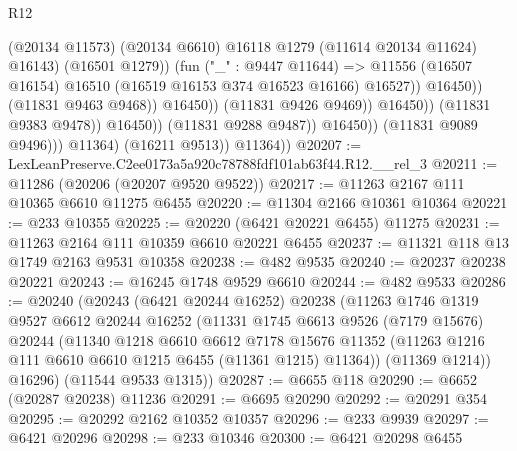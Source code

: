 \begin{lexlean}{R12}
\begin{coremodule}
                                                  (@20134 @11573)
                                                  (@20134 @6610)
                                                  @16118
                                                  @1279
                                                  (@11614 @20134 @11624)
                                                  @16143)
                                                (@16501 @1279))
                                              (fun ("_" : @9447 @11644) =>
                                              @11556
                                                (@16507 @16154)
                                                @16510
                                                (@16519 @16153 @374 @16523 @16166)
                                                @16527))
                                            @16450))
                                        (@11831 @9463 @9468))
                                      @16450))
                                  (@11831 @9426 @9469))
                                @16450))
                            (@11831 @9383 @9478))
                          @16450))
                      (@11831 @9288 @9487))
                    @16450))
                (@11831 @9089 @9496)))
            @11364)
          (@16211 @9513))
        @11364))
@20207 := LexLeanPreserve.C2ee0173a5a920c78788fdf101ab63f44.R12.__rel_3
@20211 := @11286 (@20206 (@20207 @9520 @9522))
@20217 := @11263 @2167 @111 @10365 @6610 @11275 @6455
@20220 := @11304 @2166 @10361 @10364
@20221 := @233 @10355
@20225 := @20220 (@6421 @20221 @6455) @11275
@20231 := @11263 @2164 @111 @10359 @6610 @20221 @6455
@20237 := @11321 @118 @13 @1749 @2163 @9531 @10358
@20238 := @482 @9535
@20240 := @20237 @20238 @20221
@20243 := @16245 @1748 @9529 @6610
@20244 := @482 @9533
@20286 := @20240
    (@20243
      (@6421 @20244 @16252)
      @20238
      (@11263
        @1746
        @1319
        @9527
        @6612
        @20244
        @16252
        (@11331
          @1745
          @6613
          @9526
          (@7179 @15676)
          @20244
          (@11340
            @1218
            @6610
            @6612
            @7178
            @15676
            @11352
            (@11263 @1216 @111 @6610 @6610 @1215 @6455 (@11361 @1215) @11364))
          (@11369 @1214))
        @16296)
      (@11544 @9533 @1315))
@20287 := @6655 @118
@20290 := @6652 (@20287 @20238) @11236
@20291 := @6695 @20290
@20292 := @20291 @354
@20295 := @20292 @2162 @10352 @10357
@20296 := @233 @9939
@20297 := @6421 @20296
@20298 := @233 @10346
@20300 := @6421 @20298 @6455

\end{coremodule}
\end{lexlean}
